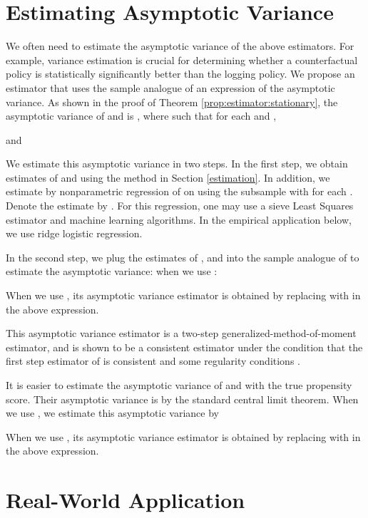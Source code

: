 \documentclass[letterpaper]{article} \usepackage{aaai19}  \usepackage{times}  \usepackage{helvet}  \usepackage{courier}  \usepackage{url}  \usepackage{graphicx}  \frenchspacing  \usepackage{comment}
\begin{document}
\section{Estimating Asymptotic Variance}\label{section:variance}
We often need to estimate the asymptotic variance of the above estimators. 
For example, variance estimation is crucial for determining whether a counterfactual policy is statistically significantly better than the logging policy. 
We propose an estimator that uses the sample analogue of an expression of the asymptotic variance.
As shown in the proof of Theorem \ref{prop:estimator:stationary}, the asymptotic variance of  and  is , where  such that  for each  and ,

and


We estimate this asymptotic variance in two steps.
In the first step, we obtain estimates of  and  using the method in Section \ref{estimation}.
In addition, we estimate  by nonparametric regression of  on  using the subsample with  for each .
Denote the estimate by .
For this regression, one may use a sieve Least Squares estimator and machine learning algorithms.
In the empirical application below, we use ridge logistic regression.

In the second step, we plug the estimates of ,  and  into the sample analogue of  to estimate the asymptotic variance: when we use :

When we use , its asymptotic variance estimator is obtained by replacing  with  in the above expression.


This asymptotic variance estimator is a two-step generalized-method-of-moment estimator, and is shown to be a consistent estimator under the condition that the first step estimator of  is consistent and some regularity conditions \cite{Newey1994}.

It is easier to estimate the asymptotic variance of  and  with the true propensity score. 
Their asymptotic variance is  by the standard central limit theorem.
When we use , we estimate this asymptotic variance by

When we use , its asymptotic variance estimator is obtained by replacing  with  in the above expression.




\section{Real-World Application}
\end{document}
